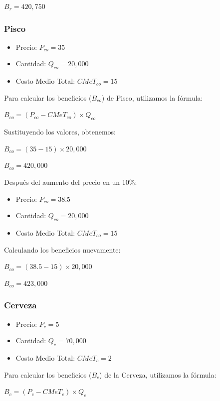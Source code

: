 \documentclass[
  doc,
  floatsintext,
  longtable,
  a4paper,
  nolmodern,
  notxfonts,
  notimes,
  12pt,
  colorlinks=true,linkcolor=blue,citecolor=blue,urlcolor=blue]{apa7}
\providecommand{\tightlist}{%
  \setlength{\itemsep}{0pt}\setlength{\parskip}{0pt}}
\begin{document}
\(B_r = 420,750\)

\subsubsection{Pisco}\label{pisco}

\begin{itemize}
\tightlist
\item
  Precio: \(P_{co} = 35\)
\item
  Cantidad: \(Q_{co} = 20,000\)
\item
  Costo Medio Total: \(CMeT_{co} = 15\)
\end{itemize}

Para calcular los beneficios (\(B_{co}\)) de Pisco, utilizamos la
fórmula:

\(B_{co} = (P_{co} - CMeT_{co}) \times Q_{co}\)

Sustituyendo los valores, obtenemos:

\(B_{co} = (35 - 15) \times 20,000\)

\(B_{co} = 420,000\)

Después del aumento del precio en un 10\%:

\begin{itemize}
\tightlist
\item
  Precio: \(P_{co} = 38.5\)
\item
  Cantidad: \(Q_{co} = 20,000\)
\item
  Costo Medio Total: \(CMeT_{co} = 15\)
\end{itemize}

Calculando los beneficios nuevamente:

\(B_{co} = (38.5 - 15) \times 20,000\)

\(B_{co} = 423,000\)

\subsubsection{Cerveza}\label{cerveza}

\begin{itemize}
\tightlist
\item
  Precio: \(P_c = 5\)
\item
  Cantidad: \(Q_c = 70,000\)
\item
  Costo Medio Total: \(CMeT_c = 2\)
\end{itemize}

Para calcular los beneficios (\(B_c\)) de la Cerveza, utilizamos la
fórmula:

\(B_c = (P_c - CMeT_c) \times Q_c\)
\end{document}
